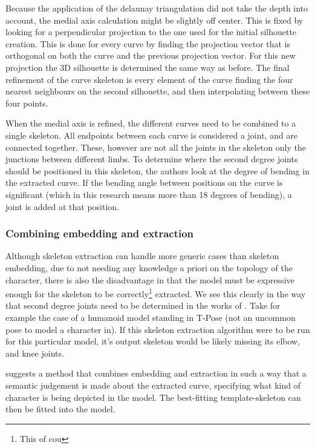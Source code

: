\documentclass{article}
\begin{document}
Because the application of the delaunay triangulation did not take the depth
into account, the medial axis calculation might be slightly off center. This is fixed
by looking for a perpendicular projection to the one used for the initial
silhouette creation. This is done for every curve by finding the projection
vector that is orthogonal on both the curve and the previous projection vector.
For this new projection the 3D silhouette is determined the same way as before.
The final refinement of the curve skeleton is  every element of the curve
finding the four nearest neighbours on the second silhouette, and then
interpolating between these four points.

When the medial axis is refined, the different curves need to be combined to a
single skeleton. All endpoints between each curve is considered a joint, and are
connected together. These, however are not all the joints in the skeleton only
the junctions between different limbs. To determine where the second degree
joints should be positioned in this skeleton, the authors look at the degree of
bending in the extracted curve. If the bending angle between positions on the curve is 
significant (which in this research means more than 18 degrees of bending), a
joint is added at that position.

\subsubsection{Combining embedding and extraction} Although skeleton extraction
can handle more generic cases than skeleton embedding, due to not needing any
knowledge a priori on the topology of the character, there is also the
disadvantage in that the model must be expressive enough for the skeleton to be
correctly\footnote{This of cou} extracted. We see this clearly in the way that
second degree joints need to be determined in the works of \citep{paper2}. Take
for example the case of a humanoid model standing in T-Pose (not an uncommon
pose to model a character in). If this skeleton extraction algorithm were to be run for
this particular model, it's output skeleton would be likely missing its elbow, and knee
joints. 

\citep{paper3} suggests a method that combines embedding and extraction in such
a way that a semantic judgement is made about the extracted curve, specifying
what kind of character is being depicted in the model. The best-fitting template-skeleton can then
be fitted into the model.
\end{document}
